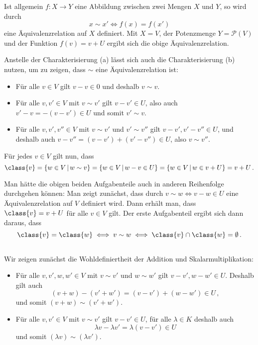 \begin{remark}
  Ist allgemein $f \colon X \to Y$ eine Abbildung zwischen zwei Mengen $X$ und $Y$, so wird durch
  \[
          x \sim x'
    \iff  f(x) = f(x')
  \]
  eine Äquivalenzrelation auf $X$ definiert.
  Mit $X = V$, der Potenzmenge $Y = \mathcal{P}(V)$ und der Funktion $f(v) = v + U$ ergibt sich die obige Äquivalenzrelation.
\end{remark}

Anstelle der Charakterisierung (a) lässt sich auch die Charakterisierung (b) nutzen, um zu zeigen, dass $\sim$ eine Äquivalenzrelation ist:

\begin{itemize}
  \item
    Für alle $v \in V$ gilt $v - v \in 0$ und deshalb $v \sim v$.
  \item
    Für alle $v, v' \in V$ mit $v \sim v'$ gilt $v - v' \in U$, also auch $v' - v = -(v - v') \in U$ und somit $v' \sim v$.
  \item
    Für alle $v, v', v'' \in V$ mit $v \sim v'$ und $v' \sim v''$ gilt $v - v', v' - v'' \in U$, und deshalb auch $v - v'' = (v - v') + (v' - v'') \in U$, also $v \sim v''$.
\end{itemize}

Für jedes $v \in V$ gilt nun, dass
\[
    \class{v}
  = \{ w \in V \suchthat w \sim v \}
  = \{ w \in V \suchthat w - v \in U \}
  = \{ w \in V \suchthat w \in v + U \}
  = v + U \,.
\]

\begin{remark}
  Man hätte die obigen beiden Aufgabenteile auch in anderen Reihenfolge durchgehen können:
  Man zeigt zunächst, dass durch $v \sim w \iff v - w \in U$ eine Äquivalenzrelation auf $V$ definiert wird.
  Dann erhält man, dass $\class{v} = v + U$ für alle $v \in V$ gilt.
  Der erste Aufgabenteil ergibt sich dann daraus, dass
  \[
          \class{v} = \class{w}
    \iff  v \sim w
    \iff  \class{v} \cap \class{w} = \emptyset \,.
  \]
\end{remark}





\subsection{}

Wir zeigen zunächst die Wohldefiniertheit der Addition und Skalarmultiplikation:

\begin{itemize}
  \item
    Für alle $v, v', w, w' \in V$ mit $v \sim v'$ und $w \sim w'$ gilt $v - v', w - w' \in U$.
    Deshalb gilt auch
    \[
          (v + w) - (v' + w')
      =   (v - v') + (w - w')
      \in U \,,
    \]
    und somit $(v + w) \sim (v' + w')$.
  \item
    Für alle $v, v' \in V$ mit $v \sim v'$ gilt $v - v' \in U$, für alle $\lambda \in K$ deshalb auch
    \[
          \lambda v - \lambda v'
      =   \lambda (v - v')
      \in U 
    \]
    und somit $(\lambda v) \sim (\lambda v')$.
\end{itemize}


